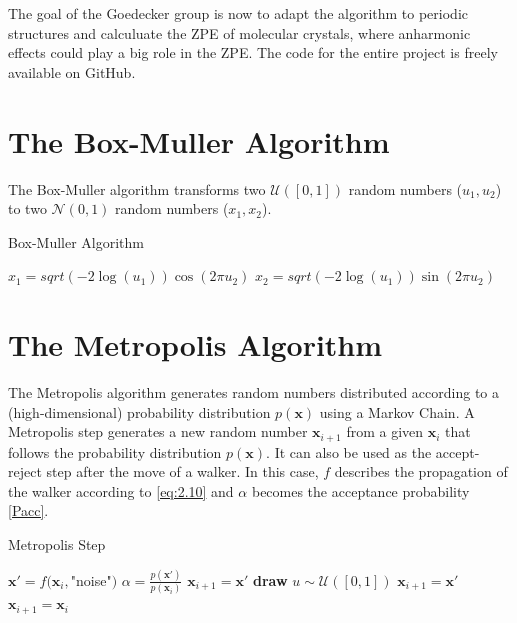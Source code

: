 \documentclass [12pt]{report}
\begin{document}
The goal of the Goedecker group is now to adapt the algorithm to periodic structures and calculuate the ZPE of molecular crystals, where anharmonic effects could play a big role in the ZPE. The code for the entire project is freely available on GitHub\cite{git}.

\begin{appendices}
\chapter{The Box-Muller Algorithm} \label{appendixA}
The Box-Muller algorithm transforms two $\mathcal{U}([0,1])$ random numbers ($u_1, u_2$) to two $\mathcal{N}(0,1)$ random numbers ($x_1, x_2$).

\begin{algorithm}
\caption{Box-Muller Algorithm}\label{box-muller}
\begin{algorithmic}[1]
\State $x_1 = sqrt(-2\log(u_1))\cos(2\pi u_2)$
\State $x_2 = sqrt(-2\log(u_1))\sin(2\pi u_2)$
\EndProcedure
\end{algorithmic}
\end{algorithm}

\chapter{The Metropolis Algorithm} \label{appendixB}
The Metropolis algorithm generates random numbers distributed according to a (high-dimensional) probability distribution $p(\bm{x})$ using a Markov Chain. A Metropolis step generates a new random number $\bm{x}_{i+1}$ from a given $\bm{x}_i$ that follows the probability distribution $p(\bm{x})$. It can also be used as the accept-reject step after the move of a walker. In this case, $f$ describes the propagation of the walker according to \eqref{eq:2.10} and $\alpha$ becomes the acceptance probability \eqref{Pacc}.

\begin{algorithm}
\caption{Metropolis Step}\label{metropolis}
\begin{algorithmic}[1]
\State $\bm{x}' = f(\bm{x}_i,$"noise"$)$ 
\State $\alpha = \frac{p(\bm{x}')}{p(\bm{x}_i)}$
	\State $\bm{x}_{i+1} = \bm{x}'$ 
\Else
	\State \textbf{draw} $u \sim \mathcal{U}([0,1])$
		\State $\bm{x}_{i+1} = \bm{x}'$ 
	\Else
		\State $\bm{x}_{i+1} = \bm{x}_i$ 
	\EndIf
\EndIf 
\EndProcedure
\end{algorithmic}
\end{algorithm}


\end{appendices}
\end{document}
